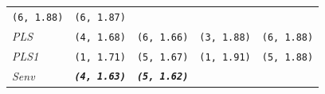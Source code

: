 \documentclass[12pt,A4paper,authoryear]{elsarticle} %
\theoremstyle{definition}
\theoremstyle{definition}
\theoremstyle{remark}
\begin{document}
\begin{longtable}[]{@{}lcccc@{}}
\begin{minipage}[t]{0.19\columnwidth}
\texttt{(6,\ 1.88)}\strut
\end{minipage} & \begin{minipage}[t]{0.19\columnwidth}\centering\strut
\texttt{(6,\ 1.87)}\strut
\end{minipage}\tabularnewline
\begin{minipage}[t]{0.09\columnwidth}\raggedright\strut
\emph{PLS}\strut
\end{minipage} & \begin{minipage}[t]{0.19\columnwidth}\centering\strut
\texttt{(4,\ 1.68)}\strut
\end{minipage} & \begin{minipage}[t]{0.19\columnwidth}\centering\strut
\texttt{(6,\ 1.66)}\strut
\end{minipage} & \begin{minipage}[t]{0.19\columnwidth}\centering\strut
\texttt{(3,\ 1.88)}\strut
\end{minipage} & \begin{minipage}[t]{0.19\columnwidth}\centering\strut
\texttt{(6,\ 1.88)}\strut
\end{minipage}\tabularnewline
\begin{minipage}[t]{0.09\columnwidth}\raggedright\strut
\emph{PLS1}\strut
\end{minipage} & \begin{minipage}[t]{0.19\columnwidth}\centering\strut
\texttt{(1,\ 1.71)}\strut
\end{minipage} & \begin{minipage}[t]{0.19\columnwidth}\centering\strut
\texttt{(5,\ 1.67)}\strut
\end{minipage} & \begin{minipage}[t]{0.19\columnwidth}\centering\strut
\texttt{(1,\ 1.91)}\strut
\end{minipage} & \begin{minipage}[t]{0.19\columnwidth}\centering\strut
\texttt{(5,\ 1.88)}\strut
\end{minipage}\tabularnewline
\begin{minipage}[t]{0.09\columnwidth}\raggedright\strut
\emph{Senv}\strut
\end{minipage} & \begin{minipage}[t]{0.19\columnwidth}\centering\strut
\textbf{\emph{\texttt{(4,\ 1.63)}}}\strut
\end{minipage} & \begin{minipage}[t]{0.19\columnwidth}\centering\strut
\textbf{\emph{\texttt{(5,\ 1.62)}}}\strut
\end{minipage} & \begin{minipage}[t]{0.19\columnwidth}\centering\strut

\end{minipage}
\end{longtable}
\end{document}
